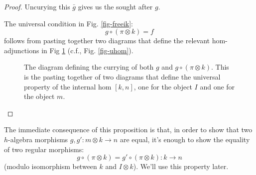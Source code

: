 \documentclass[letterpaper, 10 pt, conference]{ieeeconf}
\begin{document}
\begin{proof}
Uncurying this $\bar{g}$ gives us the sought after $g$. 


The universal condition in Fig. \ref{fig-freeik}:
\[g \circ (\pi \otimes k) = f\] 
follows from pasting together two diagrams that define the relevant hom-adjunctions in Fig \ref{fig-adjadj} (c.f., Fig. \ref{fig-uhom}).
\begin{figure}[h]
\centering
{}
\caption{The diagram defining the currying of both $g$ and $g \circ (\pi \otimes k)$. This is the pasting together of two diagrams that define the universal property of the internal hom $[k, n]$, one for the object $I$ and one for the object $m$.}
\label{fig-adjadj}
\end{figure}
\end{proof}

The immediate consequence of this proposition is that, in order to show that two $h$-algebra morphisms $g, g' \colon m \otimes k \to n$ are equal, it's enough to show the equality of two regular morphisms:
\[g \circ (\pi \otimes k) = g' \circ (\pi \otimes k) \colon k \to n\]
(modulo isomorphism between $k$ and $I \otimes k$). We'll use this property later.
\end{document}
